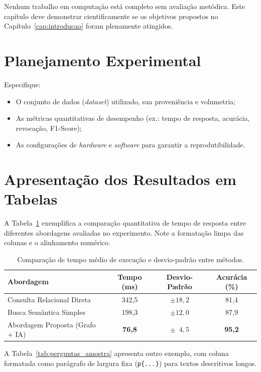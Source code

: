 \documentclass[cic,tc,biblatex]{iiufrgs}
\begin{document}
Nenhum trabalho em computação está completo sem avaliação metódica. Este capítulo deve demonstrar cientificamente se os objetivos propostos no Capítulo~\ref{cap:introducao} foram plenamente atingidos.

\section{Planejamento Experimental}
Especifique:
\begin{itemize}
    \item O conjunto de dados (\emph{dataset}) utilizado, sua proveniência e volumetria;
    \item As métricas quantitativas de desempenho (ex.: tempo de resposta, acurácia, revocação, F1-Score);
    \item As configurações de \emph{hardware} e \emph{software} para garantir a reprodutibilidade.
\end{itemize}

\section{Apresentação dos Resultados em Tabelas}
\label{sec:tabelas_experimentos}

A Tabela~\ref{tab:desempenho_consultas} exemplifica a comparação quantitativa de tempo de resposta entre diferentes abordagens avaliadas no experimento. Note a formatação limpa das colunas e o alinhamento numérico.

\begin{table}[htbp]
    \centering
    \caption{Comparação de tempo médio de execução e desvio-padrão entre métodos.}
    \label{tab:desempenho_consultas}
    \begin{tabular}{lccc}
        \toprule
        \textbf{Abordagem} & \textbf{Tempo (ms)} & \textbf{Desvio-Padrão} & \textbf{Acurácia (\%)} \\
        \midrule
        Consulta Relacional Direta     & 342,5 & $\pm 18,2$ & 81,4 \\
        Busca Semântica Simples        & 198,3 & $\pm 12,0$ & 87,9 \\
        Abordagem Proposta (Grafo + IA) & \textbf{76,8} & $\pm \phantom{0}4,5$  & \textbf{95,2} \\
        \bottomrule
    \end{tabular}
\end{table}

A Tabela~\ref{tab:perguntas_amostra} apresenta outro exemplo, com coluna formatada como parágrafo de largura fixa (\texttt{p\{...\}}) para textos descritivos longos.
\end{document}
